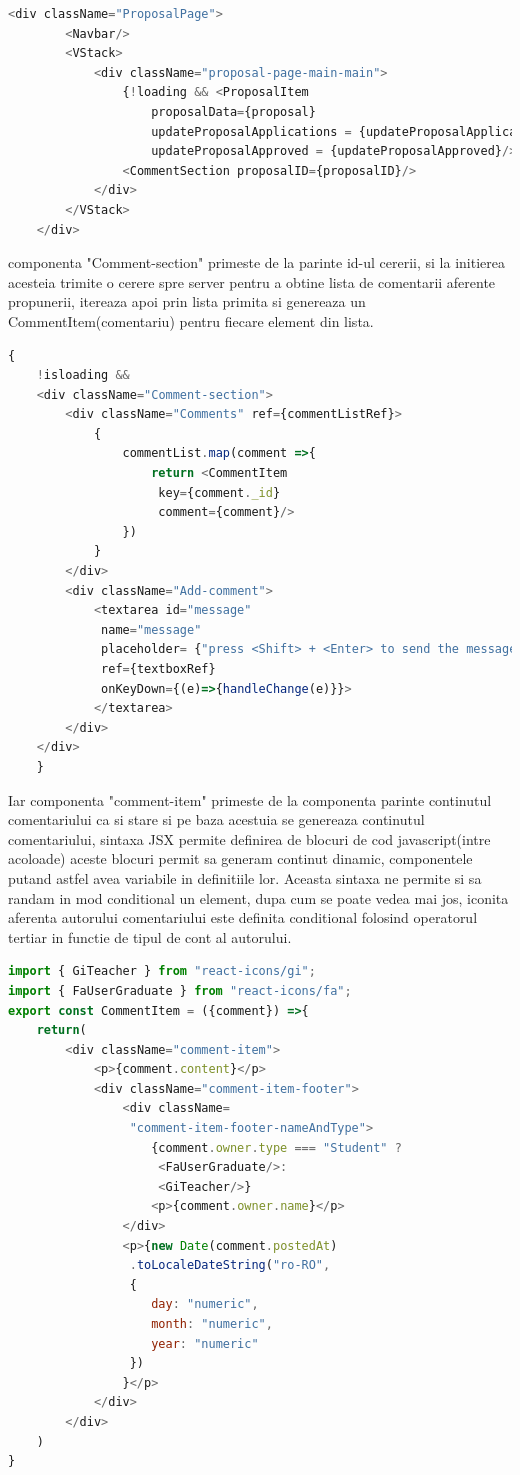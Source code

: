 \documentclass[12pt,a4paper,hidelinks]{report}
\theoremstyle{definition}
\theoremstyle{remark}
\begin{document}
\begin{lstlisting}[language=Javascript]
    <div className="ProposalPage">
        <Navbar/>
        <VStack>
            <div className="proposal-page-main-main">
                {!loading && <ProposalItem 
                    proposalData={proposal} 
                    updateProposalApplications = {updateProposalApplications} 
                    updateProposalApproved = {updateProposalApproved}/>}
                <CommentSection proposalID={proposalID}/>
            </div>
        </VStack>
    </div> 
\end{lstlisting}
componenta "Comment-section" primeste de la parinte id-ul cererii, si la initierea acesteia
trimite o cerere spre server pentru a obtine lista de comentarii aferente propunerii, itereaza 
apoi prin lista primita si genereaza un CommentItem(comentariu) pentru fiecare element din lista.
\begin{lstlisting}[language=Javascript]
    {
    !isloading &&
    <div className="Comment-section">
        <div className="Comments" ref={commentListRef}>
            {
                commentList.map(comment =>{
                    return <CommentItem 
                     key={comment._id} 
                     comment={comment}/>
                })
            }
        </div>
        <div className="Add-comment">
            <textarea id="message" 
             name="message" 
             placeholder= {"press <Shift> + <Enter> to send the message ..."}
             ref={textboxRef} 
             onKeyDown={(e)=>{handleChange(e)}}>
            </textarea>
        </div>
    </div>
    }
\end{lstlisting}
Iar componenta "comment-item" primeste de la componenta parinte continutul comentariului ca si stare
si pe baza acestuia se genereaza continutul comentariului, sintaxa JSX permite definirea de blocuri de cod javascript(intre acoloade)
aceste blocuri permit sa generam continut dinamic, componentele putand astfel avea variabile in definitiile lor.
Aceasta sintaxa ne permite si sa randam in mod conditional un element, dupa cum se poate vedea mai jos, 
iconita aferenta autorului comentariului este definita conditional folosind operatorul tertiar in functie de tipul de cont 
al autorului.
\begin{lstlisting}[language=Javascript]
import { GiTeacher } from "react-icons/gi";
import { FaUserGraduate } from "react-icons/fa";
export const CommentItem = ({comment}) =>{
    return(
        <div className="comment-item">
            <p>{comment.content}</p>
            <div className="comment-item-footer">
                <div className=
                 "comment-item-footer-nameAndType">
                    {comment.owner.type === "Student" ?
                     <FaUserGraduate/>:
                     <GiTeacher/>}
                    <p>{comment.owner.name}</p>
                </div>
                <p>{new Date(comment.postedAt)
                 .toLocaleDateString("ro-RO", 
                 { 
                    day: "numeric",
                    month: "numeric",
                    year: "numeric"
                 })
                }</p>
            </div>
        </div>
    )
}
\end{lstlisting}
\end{document}
